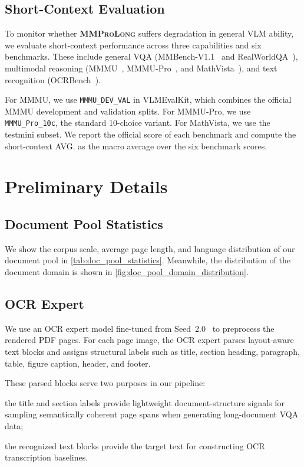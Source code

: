 \documentclass{llmxive}
\providecommand{\modelname}{\textsc{\textbf{MMProLong}}\xspace}
\begin{document}
{{{\subsection{Short-Context Evaluation}
\label{app:evaluation_details:short_context}
To monitor whether \modelname suffers degradation in general VLM ability, we evaluate short-context performance across three capabilities and six benchmarks.
These include general VQA (MMBench-V1.1~\citep{liu2024mmbench} and RealWorldQA~\citep{grok15}), multimodal reasoning (MMMU~\citep{yue2024mmmu}, MMMU-Pro~\citep{yue2025mmmupro}, and MathVista~\citep{lu2023mathvista}), and text recognition (OCRBench~\citep{liu2024ocrbench}).

For MMMU, we use \texttt{MMMU\_DEV\_VAL} in VLMEvalKit, which combines the official MMMU development and validation splits.
For MMMU-Pro, we use \texttt{MMMU\_Pro\_10c}, the standard 10-choice variant.
For MathVista, we use the testmini subset.
We report the official score of each benchmark and compute the short-context AVG. as the macro average over the six benchmark scores.

\section{Preliminary Details}
\subsection{Document Pool Statistics}
\label{app:document_pool_stats}
We show the corpus scale, average page length, and language distribution of our document pool in \cref{tab:doc_pool_statistics}.
Meanwhile, the distribution of the document domain is shown in \cref{fig:doc_pool_domain_distribution}.

\subsection{OCR Expert}
We use an OCR expert model fine-tuned from Seed~2.0~\citep{seed2_0} to preprocess the rendered PDF pages.
For each page image, the OCR expert parses layout-aware text blocks and assigns structural labels such as title, section heading, paragraph, table, figure caption, header, and footer.

These parsed blocks serve two purposes in our pipeline:
\begin{inparaenum}[(i)]
\item the title and section labels provide lightweight document-structure signals for sampling semantically coherent page spans when generating long-document VQA data;
\item the recognized text blocks provide the target text for constructing OCR transcription baselines.
\end{inparaenum}

}}}
\end{document}
